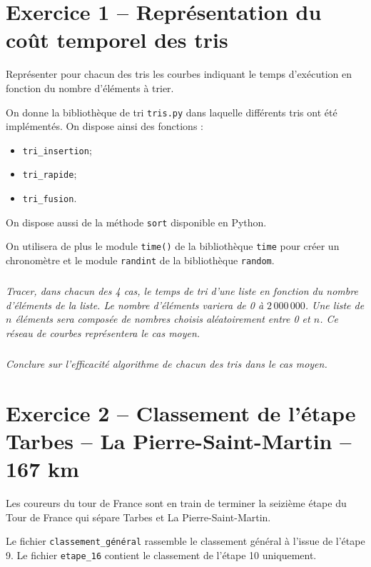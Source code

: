 \documentclass[10pt,fleqn]{article} %
\begin{document}

\vspace{5cm}
\pagestyle{fancy}
\thispagestyle{plain}


\def\columnseprulecolor{\color{ocre}}
\setlength{\columnseprule}{0.4pt} 
\begin{multicols}{2}

\section*{Exercice 1 -- Représentation du coût temporel des tris}

\begin{obj}
Représenter pour chacun des tris les courbes indiquant le temps d'exécution en fonction du nombre d'éléments à trier.
\end{obj}
On donne la bibliothèque de tri \texttt{tris.py} dans laquelle différents tris ont été implémentés.
On dispose ainsi des fonctions : 
\begin{itemize}
\item \texttt{tri\_insertion};
\item \texttt{tri\_rapide};
\item \texttt{tri\_fusion}.
\end{itemize}
On dispose aussi de la méthode \texttt{sort} disponible en Python.

On utilisera de plus le module \texttt{time()} de la bibliothèque \texttt{time} pour créer un chronomètre et le module \texttt{randint} de la bibliothèque \texttt{random}.


\subparagraph{}
\textit{Tracer, dans chacun des 4 cas, le temps de tri d'une liste en fonction du nombre d'éléments de la liste. Le nombre d'éléments variera de 0 à $2\, 000\,000$. Une liste de $n$ éléments sera composée de nombres choisis aléatoirement entre 0 et $n$. Ce réseau de courbes représentera le cas moyen.}


\subparagraph{}
\textit{Conclure sur l'efficacité algorithme de chacun des tris dans le cas moyen.}


\section*{Exercice 2 -- Classement de l'étape Tarbes -- La Pierre-Saint-Martin -- 167 km}
Les coureurs du tour de France sont en train de terminer la seizième étape du Tour de France qui sépare Tarbes et La Pierre-Saint-Martin. 

Le fichier \texttt{classement\_général} rassemble le classement général à l'issue de l'étape 9. 
Le fichier \texttt{etape\_16} contient le classement de l'étape 10 uniquement.



\end{multicols}
\end{document}
